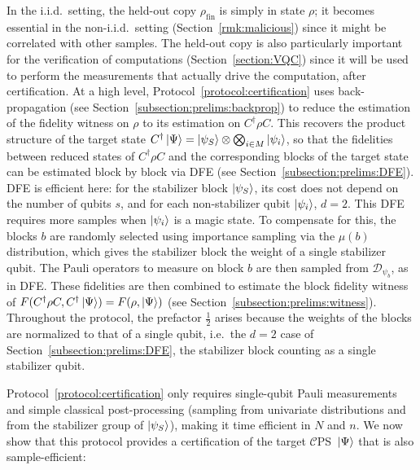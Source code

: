 \documentclass[a4paper,twocolumn,11pt,unpublished]{quantumarticle}
\newcommand{\CEPS}{$\mathcal C$PS}
\begin{document}
        In the i.i.d.\ setting, the held-out copy $\rho_{\mathrm{fin}}$ is simply in state $\rho$; it becomes essential in the non-i.i.d.\ setting (Section~\ref{rmk:malicious}) since it might be correlated with other samples. The held-out copy is also particularly important for the verification of computations (Section~\ref{section:VQC}) since it will be used to perform the measurements that actually drive the computation, after certification. At a high level, Protocol~\ref{protocol:certification} uses back-propagation (see Section~\ref{subsection:prelims:backprop}) to reduce the estimation of the fidelity witness on $\rho$ to its estimation on $C^\dag\rho C$. This recovers the product structure of the target state $C^\dag\ket\Psi=\ket{\psi_S}\otimes\bigotimes_{i\in M}\ket{\psi_i}$, so that the fidelities between reduced states of $C^\dag\rho C$ and the corresponding blocks of the target state can be estimated block by block via DFE (see Section~\ref{subsection:prelims:DFE}). DFE is efficient here: for the stabilizer block $\ket{\psi_S}$, its cost does not depend on the number of qubits $s$, and for each non-stabilizer qubit $\ket{\psi_i}$, $d=2$. This DFE requires more samples when $\ket{\psi_i}$ is a magic state. To compensate for this, the blocks $b$ are randomly selected using importance sampling via the $\mu(b)$ distribution, which gives the stabilizer block the weight of a single stabilizer qubit. The Pauli operators to measure on block $b$ are then sampled from $\mathcal{D}_{\psi_b}$, as in DFE. These fidelities are then combined to estimate the block fidelity witness of $F(C^\dag\rho C,C^\dag\ket\Psi)=F(\rho,\ket\Psi)$ (see Section~\ref{subsection:prelims:witness}). Throughout the protocol, the prefactor $\tfrac12$ arises because the weights of the blocks are normalized to that of a single qubit, i.e.\ the $d=2$ case of Section~\ref{subsection:prelims:DFE}, the stabilizer block counting as a single stabilizer qubit.
        
        Protocol~\ref{protocol:certification} only requires single-qubit Pauli measurements and simple classical post-processing (sampling from univariate distributions and from the stabilizer group of $\ket{\psi_S}$), making it time efficient in $N$ and $n$. We now show that this protocol provides a certification of the target \CEPS\ $\ket\Psi$ that is also sample-efficient:
\end{document}

